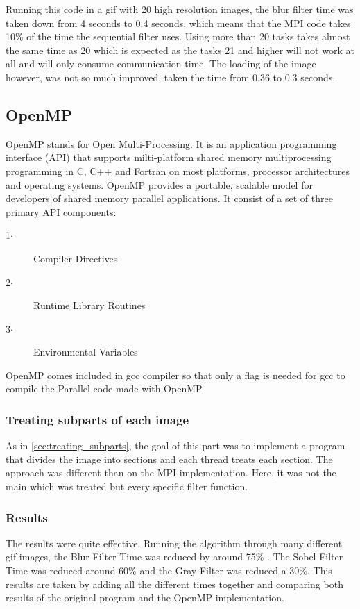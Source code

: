 \documentclass[conference,compsoc]{IEEEtran}
\begin{document}
Running this code in a gif with 20 high resolution images, the blur filter time was taken down from 4 seconds to 0.4 seconds, which means that the MPI code takes 10\% of the time the sequential filter uses. Using more than 20 tasks takes almost the same time as 20 which is expected as the tasks 21 and higher will not work at all and will only consume communication time.
The loading of the image however, was not so much improved, taken the time from 0.36 to 0.3 seconds.


\subsection{OpenMP} \label{sec:OpenMP}
OpenMP stands for Open Multi-Processing. It is an application programming interface (API) that supports milti-platform shared memory multiprocessing programming in C, C++ and Fortran on most platforms, processor architectures and operating systems.
OpenMP provides a portable, scalable model for developers of shared memory parallel applications.
It consist of a set of three primary API components:
\begin{description}
	\item[1$\cdot$] Compiler Directives
	\item[2$\cdot$] Runtime Library Routines
	\item[3$\cdot$] Environmental Variables
\end{description}

OpenMP comes included in gcc compiler so that only a flag is needed for gcc to compile the Parallel code made with OpenMP.

\subsubsection{Treating subparts of each image}
As in \ref{sec:treating_subparts}, the goal of this part was to implement a program that divides the image into sections and each thread treats each section. The approach was different than on the MPI implementation. Here, it was not the main which was treated but every specific filter function.

\subsubsection{Results} \label{sec:results}
The results were quite effective. Running the algorithm through many different gif images, the Blur Filter Time was reduced by around 75\% . The Sobel Filter Time was reduced around 60\% and the Gray Filter was reduced a 30\%. This results are taken by adding all the different times together and comparing both results of the original program and the OpenMP implementation.
\end{document}

